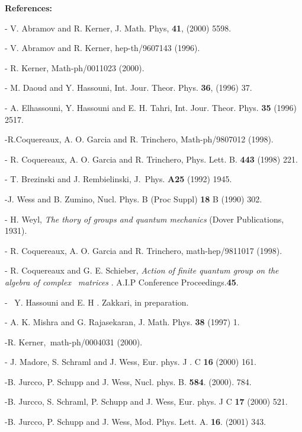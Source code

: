 \documentclass[a4paper,12pt,thmsa]{article}
\begin{document}
\newpage

\textbf{References:}

\myHighlight{$\left[ 1\right] $}\coordHE{}- V. Abramov and R. Kerner, J. Math. Phys, \textbf{41},
(2000) 5598.

\myHighlight{$\left[ 2\right] $}\coordHE{} - V. Abramov and R. Kerner, hep-th/9607143 (1996).

\myHighlight{$\left[ 3\right] $}\coordHE{} - R. Kerner, Math-ph/0011023 (2000).

\myHighlight{$\left[ 4\right] $}\coordHE{}- M. Daoud and Y. Hassouni, Int. Jour. Theor. Phys.
\textbf{36}, (1996) 37.

\myHighlight{$\left[ 5\right] $}\coordHE{}- A. Elhassouni, Y. Hassouni and E. H. Tahri, Int. Jour.
Theor. Phys. \textbf{35 } (1996) 2517.

\myHighlight{$\left[ 6\right] $}\coordHE{}-R.Coquereaux, A. O. Garcia and R. Trinchero,
Math-ph/9807012 (1998).

\myHighlight{$\left[ 7\right] $}\coordHE{}- R. Coquereaux, A. O. Garcia and R. Trinchero, Phys.
Lett. B. \textbf{443} (1998) 221.

\myHighlight{$\left[ 8\right] $}\coordHE{}- T. Brezinski and J. Rembielinski, J.\ Phys. \textbf{A25}
(1992) 1945.

\myHighlight{$\left[ 9\right] $}\coordHE{}-J. Wess and B. Zumino, Nucl. Phys. B (Proc Suppl) \textbf{%
18} B (1990) 302.

\myHighlight{$[10]$}\coordHE{}- H. Weyl, \textit{The thory of groups and quantum mechanics} (Dover
Publications, 1931).

\myHighlight{$\left[ 11\right] $}\coordHE{}- R. Coquereaux, A. O. Garcia and R. Trinchero,
math-hep/9811017 (1998).

\myHighlight{$\left[ 12\right] $}\coordHE{}- R. Coquereaux and G. E. Schieber, \textit{Action of
finite quantum group on the algebra of complex }\coordHE{}\textit{\ matrices%
}. A.I.P Conference Proceedings.\textbf{45}.

\myHighlight{$\left[ 13\right] $}\coordHE{}- \ Y. Hassouni and E. H . Zakkari, in preparation.

\myHighlight{$\left[ 14\right] $}\coordHE{}- A. K. Mishra and G. Rajasekaran, J. Math. Phys. \textbf{%
38} (1997) 1.

\myHighlight{$[15]$}\coordHE{}-R. Kerner,\textit{\ }math-ph/0004031 (2000).

\myHighlight{$\left[ 16\right] $}\coordHE{}- J. Madore, S. Schraml and J. Wess, Eur. phys. J . C
\textbf{16} (2000) 161.

\myHighlight{$\left[ 17\right] $}\coordHE{}-B. Jurcco, P. Schupp and J. Wess, Nucl. phys. B. \textbf{%
584}. (2000). 784.

\myHighlight{$\left[ 18\right] $}\coordHE{}-B. Jurcco, S. Schraml, P. Schupp and J. Wess, Eur. phys.
J C \textbf{17} (2000) 521.

\myHighlight{$\left[ 19\right] $}\coordHE{}-B. Jurcco, P. Schupp and J. Wess, Mod. Phys. Lett. A.
\textbf{16}. (2001) 343.\myHighlight{$\ $}\coordHE{}
\end{document}
